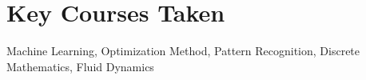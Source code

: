 \section{Key Courses Taken}
 \cvCourseListStart
  \cvCourseItem{}
    {Machine Learning, Optimization Method, Pattern Recognition, Discrete Mathematics, Fluid Dynamics}
    \vspace{-0.5em}
 \cvCourseListEnd%